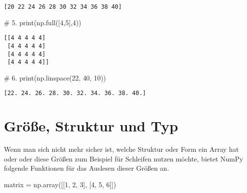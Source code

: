 \documentclass[
  letterpaper,
  DIV=11,
  numbers=noendperiod]{scrreprt}
\newenvironment{Shaded}{\begin{snugshade}}{\end{snugshade}}
\newcommand{\BuiltInTok}[1]{\textcolor[rgb]{0.00,0.23,0.31}{#1}}
\newcommand{\CommentTok}[1]{\textcolor[rgb]{0.37,0.37,0.37}{#1}}
\newcommand{\DecValTok}[1]{\textcolor[rgb]{0.68,0.00,0.00}{#1}}
\newcommand{\NormalTok}[1]{\textcolor[rgb]{0.00,0.23,0.31}{#1}}
\newcommand{\OperatorTok}[1]{\textcolor[rgb]{0.37,0.37,0.37}{#1}}
\begin{document}
\begin{tcolorbox}
\begin{tcolorbox}
\begin{tcolorbox}
\begin{verbatim}
[20 22 24 26 28 30 32 34 36 38 40]
\end{verbatim}

\begin{Shaded}
\begin{Highlighting}[]
\CommentTok{\# 5. }
\BuiltInTok{print}\NormalTok{(np.full([}\DecValTok{4}\NormalTok{,}\DecValTok{5}\NormalTok{],}\DecValTok{4}\NormalTok{))}
\end{Highlighting}
\end{Shaded}

\begin{verbatim}
[[4 4 4 4 4]
 [4 4 4 4 4]
 [4 4 4 4 4]
 [4 4 4 4 4]]
\end{verbatim}

\begin{Shaded}
\begin{Highlighting}[]
\CommentTok{\# 6. }
\BuiltInTok{print}\NormalTok{(np.linspace(}\DecValTok{22}\NormalTok{, }\DecValTok{40}\NormalTok{, }\DecValTok{10}\NormalTok{))}
\end{Highlighting}
\end{Shaded}

\begin{verbatim}
[22. 24. 26. 28. 30. 32. 34. 36. 38. 40.]
\end{verbatim}

\end{tcolorbox}

\end{tcolorbox}

\chapter{Größe, Struktur und Typ}\label{gruxf6uxdfe-struktur-und-typ}

Wenn man sich nicht mehr sicher ist, welche Struktur oder Form ein Array
hat oder oder diese Größen zum Beispiel für Schleifen nutzen möchte,
bietet NumPy folgende Funktionen für das Auslesen dieser Größen an.

\begin{Shaded}
\begin{Highlighting}[]
\NormalTok{matrix }\OperatorTok{=}\NormalTok{ np.array([[}\DecValTok{1}\NormalTok{, }\DecValTok{2}\NormalTok{, }\DecValTok{3}\NormalTok{], [}\DecValTok{4}\NormalTok{, }\DecValTok{5}\NormalTok{, }\DecValTok{6}\NormalTok{]])}
\end{Highlighting}
\end{Shaded}


\end{tcolorbox}
\end{document}
